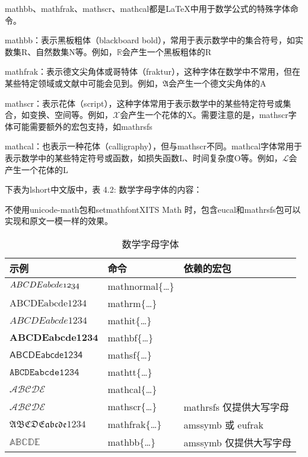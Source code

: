 \documentclass{article}
\begin{document}
‌mathbb、mathfrak、mathscr、mathcal都是LaTeX中用于数学公式的特殊字体命令‌。

‌mathbb‌：表示黑板粗体（blackboard bold），常用于表示数学中的集合符号，如实数集R、自然数集N等。例如，$\mathbb{R}$会产生一个黑板粗体的R‌

‌mathfrak‌：表示德文尖角体或哥特体（fraktur），这种字体在数学中不常用，但在某些特定领域或文献中可能会见到。例如，$\mathfrak{A}$会产生一个德文尖角体的A‌

‌mathscr‌：表示花体（script），这种字体常用于表示数学中的某些特定符号或集合，如变换、空间等。例如，$\mathscr{X}$会产生一个花体的X‌。需要注意的是，mathscr字体可能需要额外的宏包支持，如mathrsfs‌


‌mathcal‌：也表示一种花体（calligraphy），但与mathscr不同。mathcal字体常用于表示数学中的某些特定符号或函数，如损失函数L、时间复杂度O等。例如，$\mathcal{L}$会产生一个花体的L‌


下表为lshort中文版中，表 4.2: 数学字母字体的内容：

不使用unicode-math包和setmathfont{XITS Math} 时，包含eucal和mathrsfs包可以实现和原文一模一样的效果。
\begin{table}[htp]
  \centering
  \caption{数学字母字体} \label{tbl:math-fonts}
  \begin{tabular}{*{3}{l}}
  \hline
  \textbf{示例}    & \textbf{命令} & \textbf{依赖的宏包}\\
  \hline
  $\mathnormal{ABCDE abcde 1234}$  & {mathnormal}\{\ldots\}&       \\
  $\mathrm{ABCDE abcde 1234}$      & {mathrm}\{\ldots\}    &       \\
  $\mathit{ABCDE abcde 1234}$      & {mathit}\{\ldots\}    &       \\
  $\mathbf{ABCDE abcde 1234}$      & {mathbf}\{\ldots\}    &       \\
  $\mathsf{ABCDE abcde 1234}$      & {mathsf}\{\ldots\}    &       \\
  $\mathtt{ABCDE abcde 1234}$      & {mathtt}\{\ldots\}    &       \\
  $\mathcal{ABCDE}$                  & {mathcal}\{\ldots\}   &     \\ 
  \hline
  $\mathscr{ABCDE}$                & {mathscr}\{\ldots\}   & {mathrsfs} 仅提供大写字母\\
  $\mathfrak{ABCDE abcde 1234}$    & {mathfrak}\{\ldots\}  & {amssymb} 或 {eufrak}  \\
  $\mathbb{ABCDE}$                 & {mathbb}\{\ldots\}    & {amssymb} 仅提供大写字母 \\
  \hline
  \end{tabular}
\end{table}
\end{document}
